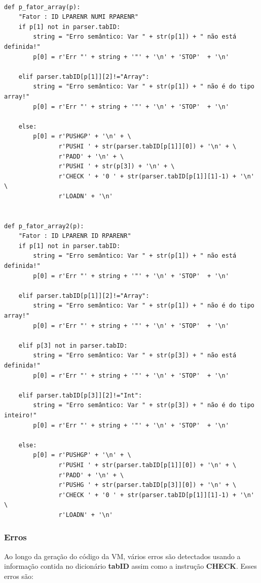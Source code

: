\documentclass{article}
\begin{document}
\begin{lstlisting}[firstnumber=509]

def p_fator_array(p):
    "Fator : ID LPARENR NUMI RPARENR" 
    if p[1] not in parser.tabID:
        string = "Erro semântico: Var " + str(p[1]) + " não está definida!"
        p[0] = r'Err "' + string + '"' + '\n' + 'STOP'  + '\n'

    elif parser.tabID[p[1]][2]!="Array":
        string = "Erro semântico: Var " + str(p[1]) + " não é do tipo array!"
        p[0] = r'Err "' + string + '"' + '\n' + 'STOP'  + '\n'

    else:
        p[0] = r'PUSHGP' + '\n' + \
               r'PUSHI ' + str(parser.tabID[p[1]][0]) + '\n' + \
               r'PADD' + '\n' + \
               r'PUSHI ' + str(p[3]) + '\n' + \
               r'CHECK ' + '0 ' + str(parser.tabID[p[1]][1]-1) + '\n' \
               r'LOADN' + '\n'
        

def p_fator_array2(p):
    "Fator : ID LPARENR ID RPARENR"
    if p[1] not in parser.tabID:
        string = "Erro semântico: Var " + str(p[1]) + " não está definida!"
        p[0] = r'Err "' + string + '"' + '\n' + 'STOP'  + '\n'

    elif parser.tabID[p[1]][2]!="Array":
        string = "Erro semântico: Var " + str(p[1]) + " não é do tipo array!"
        p[0] = r'Err "' + string + '"' + '\n' + 'STOP'  + '\n'

    elif p[3] not in parser.tabID:
        string = "Erro semântico: Var " + str(p[3]) + " não está definida!"
        p[0] = r'Err "' + string + '"' + '\n' + 'STOP'  + '\n'

    elif parser.tabID[p[3]][2]!="Int":
        string = "Erro semântico: Var " + str(p[3]) + " não é do tipo inteiro!"
        p[0] = r'Err "' + string + '"' + '\n' + 'STOP'  + '\n'

    else:
        p[0] = r'PUSHGP' + '\n' + \
               r'PUSHI ' + str(parser.tabID[p[1]][0]) + '\n' + \
               r'PADD' + '\n' + \
               r'PUSHG ' + str(parser.tabID[p[3]][0]) + '\n' + \
               r'CHECK ' + '0 ' + str(parser.tabID[p[1]][1]-1) + '\n' \
               r'LOADN' + '\n'
\end{lstlisting}


\subsubsection {Erros}
\setlength{\parindent}{5ex}
Ao longo da geração do código da VM, vários erros são detectados usando a informação contida no dicionário \textbf{tabID} assim como a instrução \textbf{CHECK}. Esses erros são:
\end{document}
